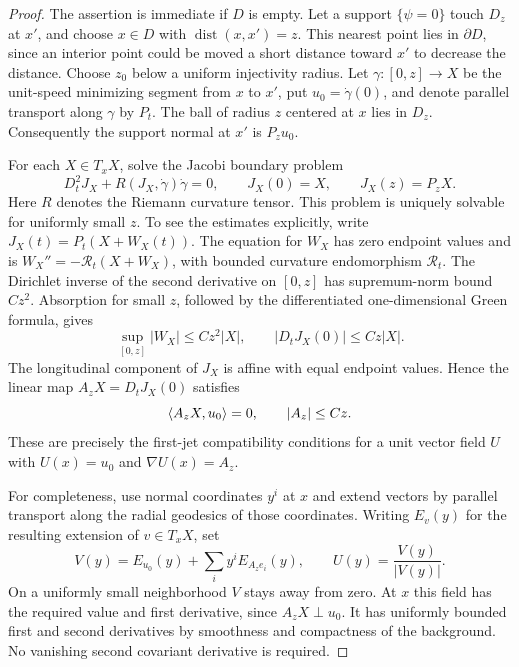 \begin{proof}
The assertion is immediate if $D$ is empty.  Let a support $\{\psi=0\}$
touch $D_z$ at $x'$, and choose $x\in D$ with
$\operatorname{dist}(x,x')=z$.  This nearest point lies in $\partial D$,
since an interior point could be moved a short distance toward $x'$ to
decrease the distance.  Choose $z_0$ below a uniform injectivity
radius.  Let $\gamma:[0,z]\to X$ be the unit-speed minimizing segment from
$x$ to $x'$, put $u_0=\dot\gamma(0)$, and denote parallel transport along
$\gamma$ by $P_t$.  The ball of radius $z$ centered at $x$ lies in $D_z$.
Consequently the support normal at $x'$ is $P_z u_0$.

For each $X\in T_xX$, solve the Jacobi boundary problem
\begin{equation}\label{four:geo:jacobi-transport}
 D_t^2J_X+R(J_X,\dot\gamma)\dot\gamma=0,
 \qquad J_X(0)=X,\qquad J_X(z)=P_zX.
\end{equation}
Here $R$ denotes the Riemann curvature tensor.  This problem is uniquely
solvable for uniformly small $z$.  To see the estimates explicitly, write
$J_X(t)=P_t(X+W_X(t))$.  The equation for $W_X$ has zero endpoint values
and is
$W_X''=-\mathcal R_t(X+W_X)$, with bounded curvature endomorphism
$\mathcal R_t$.  The Dirichlet inverse of the second derivative on
$[0,z]$ has supremum-norm bound $Cz^2$.  Absorption for small $z$, followed
by the differentiated one-dimensional Green formula, gives
\begin{equation}\label{four:geo:jacobi-jet-bounds}
 \sup_{[0,z]}|W_X|\le Cz^2|X|,
 \qquad |D_tJ_X(0)|\le Cz|X|.
\end{equation}
The longitudinal component of $J_X$ is affine with equal endpoint values.
Hence the linear map $A_zX=D_tJ_X(0)$ satisfies
\[
 \langle A_zX,u_0\rangle=0,\qquad |A_z|\le Cz.
\]
These are precisely the first-jet compatibility conditions for a unit
vector field $U$ with $U(x)=u_0$ and $\nabla U(x)=A_z$.

For completeness, use normal coordinates $y^i$ at $x$ and extend vectors
by parallel transport along the radial geodesics of those coordinates.
Writing $E_v(y)$ for the resulting extension of $v\in T_xX$, set
\[
 V(y)=E_{u_0}(y)+\sum_i y^i E_{A_ze_i}(y),\qquad
 U(y)=\frac{V(y)}{|V(y)|}.
\]
On a uniformly small neighborhood $V$ stays away from zero.  At $x$ this
field has the required value and first derivative, since $A_zX\perp u_0$.
It has uniformly bounded first and second derivatives by smoothness and
compactness of the background.  No vanishing second covariant derivative
is required.


\end{proof}
